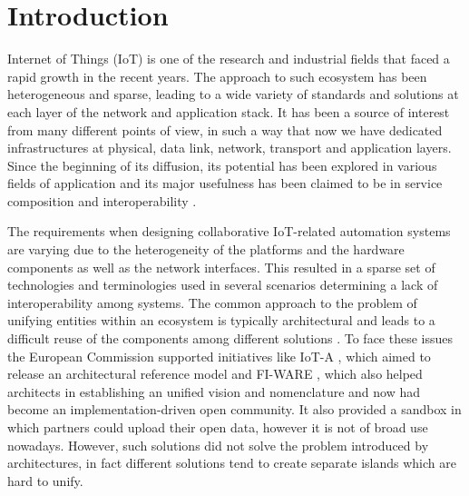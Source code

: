 \section{Introduction}
Internet of Things (IoT) is one of the research and industrial fields that faced a rapid growth in the recent years.
The approach to such ecosystem has been heterogeneous and sparse, leading to a wide variety of standards and solutions at each layer of the network and application stack.
It has been a source of interest from many different points of view, in such a way that now we have dedicated infrastructures at physical, data link, network, transport and application layers.
\\

Since the beginning of its diffusion, its potential has been explored in various fields of application and its major usefulness has been claimed to be in service composition and interoperability \cite{atzori2010internet}.

The requirements when designing collaborative IoT-related automation systems are varying due to the heterogeneity of the platforms and the hardware components as well as the network interfaces.
This resulted in a sparse set of technologies and terminologies used in several scenarios determining a lack of interoperability among systems.
The common approach to the problem of unifying entities within an ecosystem is typically architectural and leads to a difficult reuse of the components among different solutions \cite{krco2014designing}.
To face these issues the European Commission supported initiatives like IoT-A \cite{iot-a}, which aimed to release an architectural reference model and FI-WARE \cite{fiware}, which also helped architects in establishing an unified vision and nomenclature and now had become an implementation-driven open community.
It also provided a sandbox in which partners could upload their open data, however it is not of broad use nowadays.
However, such solutions did not solve the problem introduced by architectures, in fact different solutions tend to create separate islands which are hard to unify.
\\

